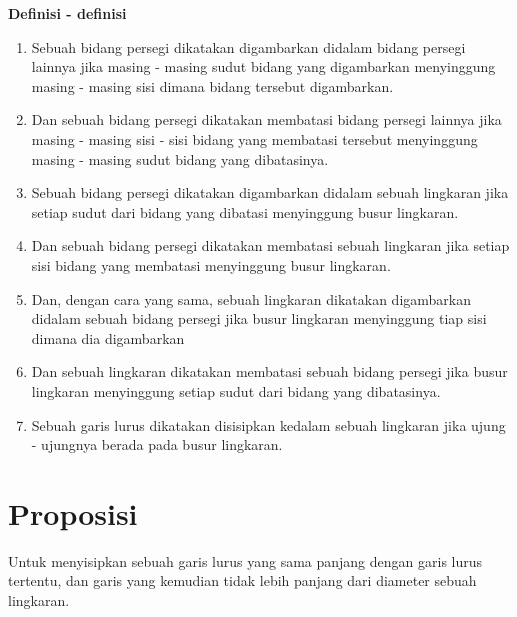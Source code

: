 \documentclass[a4paper]{book}
\begin{document}
\begin{center}
\textbf{Definisi - definisi}
\end{center} 
\begin{enumerate}
\item Sebuah bidang persegi dikatakan digambarkan didalam bidang 
persegi lainnya jika masing - masing sudut bidang yang digambarkan
menyinggung masing - masing sisi dimana bidang tersebut digambarkan.
\item Dan sebuah bidang persegi dikatakan membatasi bidang persegi
lainnya jika masing - masing sisi - sisi bidang yang membatasi tersebut
menyinggung masing - masing sudut bidang yang dibatasinya.
\item Sebuah bidang persegi dikatakan digambarkan didalam sebuah lingkaran
jika setiap sudut dari bidang yang dibatasi menyinggung busur lingkaran.
\item Dan sebuah bidang persegi dikatakan membatasi sebuah lingkaran jika
setiap sisi bidang yang membatasi menyinggung busur lingkaran.
\item Dan, dengan cara yang sama, sebuah lingkaran dikatakan digambarkan
didalam sebuah bidang persegi jika busur lingkaran menyinggung tiap
sisi dimana dia digambarkan
\item Dan sebuah lingkaran dikatakan membatasi sebuah bidang persegi
jika busur lingkaran menyinggung setiap sudut dari bidang yang dibatasinya.
\item Sebuah garis lurus dikatakan disisipkan kedalam sebuah lingkaran jika
ujung - ujungnya berada pada busur lingkaran.
\end{enumerate}

\section*{\centering Proposisi \thesection}
Untuk menyisipkan sebuah garis lurus yang sama panjang dengan garis lurus
tertentu, dan garis yang kemudian tidak lebih panjang dari diameter sebuah
lingkaran.

\begin{center}
\end{center}
\end{document}
